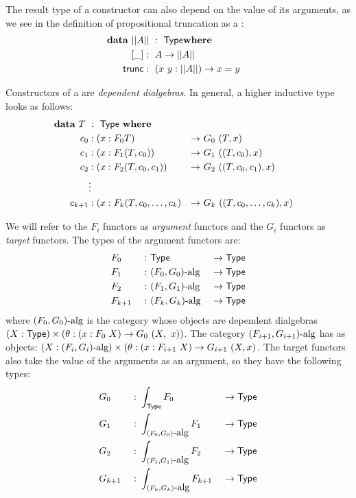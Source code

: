 \documentclass[a4paper,10pt]{article}
\begin{document}
The result type of a constructor can also depend on the value of its
arguments, as we see in the definition of propositional truncation as
a \hit:
%
\begin{alignat*}{2}
  &\rlap{$\data\ || A ||\ :\ \Type \where$} \\
  &&\ \ [\_]   &:\ A \to || A || \\
  &&\ \ \trunc &:\ (x\ y : || A ||) \to x = y
\end{alignat*}

Constructors of a \hit are \emph{dependent dialgebras}. In general, a
higher inductive type looks as follows:
%
\begin{alignat*}{5}
  &\rlap{$\data\ T\ :\ \Type\ \where$}& \\
  &&\ \ c_0    &: (x : F_0 T)                    &\to\ &G_0\ (T, x)& \\
  &&\ \ c_1    &: (x : F_1 (T,c_0))              &\to\ &G_1\ ((T, c_0), x)& \\
  &&\ \ c_2    &: (x : F_2 (T,c_0,c_1))          &\to\ &G_2\ ((T, c_0, c_1), x)& \\
  &&\ \        &\vdots &&\\
  &&\ \ c_{k+1} & : (x : F_k (T,c_0, \hdots, c_k) &\to\ &G_k\ ((T, c_0, \hdots, c_k), x)&
\end{alignat*}

We will refer to the $F_i$ functors as \emph{argument} functors and the
$G_i$ functors as \emph{target} functors. The types of the argument
functors are:
%
\begin{alignat*}{6}
&F_0     &\ :\ &\mathsf{Type}                &\ \to \mathsf{Type}& \\
&F_1     &\ :\ &(F_0, G_0)\mbox{-alg}  &\ \to \mathsf{Type}& \\      
&F_2     &\ :\ &(F_1, G_1)\mbox{-alg}  &\ \to \mathsf{Type}& \\      
&F_{k+1} &\ :\ &(F_k, G_k)\mbox{-alg}  &\ \to \mathsf{Type}&
\end{alignat*}
%
where $(F_0, G_0)\mbox{-alg}$ is the category whose objects are dependent
dialgebras $(X : \mathsf{Type}) \times (\theta : (x : F_0\ X) \to G_0\ (X,\ x))$. The category
$(F_{i+1},G_{i+1})\mbox{-alg}$ has as objects: $(X : (F_i,G_i)\mbox{-alg}) \times (\theta : (x :
F_{i+1}\ X) \to G_{i+1}\ (X, x)$. The target functors also take the value of
the arguments as an argument, so they have the following types:
%
\begin{alignat*}{6}
&G_0     &\ :\ &\int_{\Type} F_0                &\ \to \Type& \\
&G_1     &\ :\ &\int_{\algcat{(F_0, G_0)}} F_1  &\ \to \Type& \\      
&G_2     &\ :\ &\int_{\algcat{(F_1, G_1)}} F_2  &\ \to \Type& \\      
&G_{k+1} &\ :\ &\int_{\algcat{(F_k, G_k)}} F_{k+1}  &\ \to \Type&
\end{alignat*}
\end{document}
